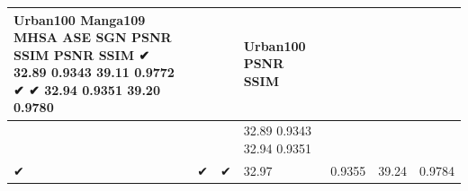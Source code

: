 \begin{tabular}{lllllll}
\toprule
Urban100 Manga109 MHSA ASE SGN PSNR SSIM PSNR SSIM ✔ 32.89 0.9343 39.11 0.9772 ✔ ✔ 32.94 0.9351 39.20 0.9780 &  &  & Urban100 PSNR SSIM &  &  &  \\
\midrule
 &  &  & 32.89 0.9343 32.94 0.9351 &  &  &  \\
✔ & ✔ & ✔ & 32.97 & 0.9355 & 39.24 & 0.9784 \\
\bottomrule
\end{tabular}
